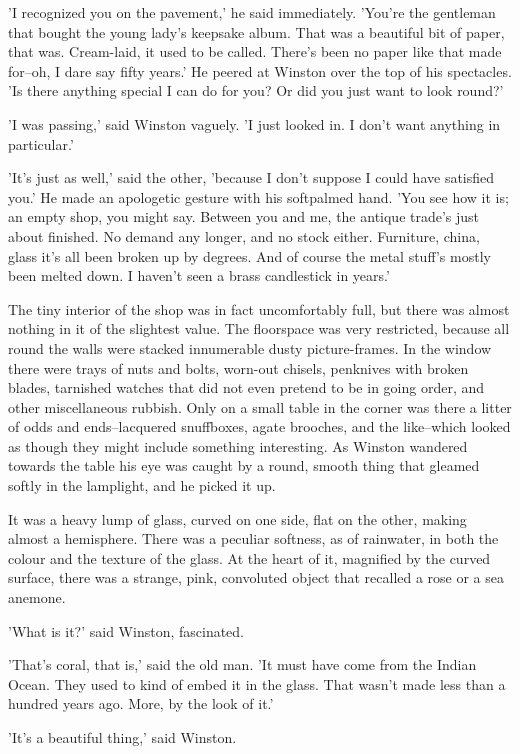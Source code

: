 \documentclass{article}
\begin{document}
'I recognized you on the pavement,' he said immediately. 'You're the
gentleman that bought the young lady's keepsake album. That was a beautiful
bit of paper, that was. Cream-laid, it used to be called. There's been no
paper like that made for--oh, I dare say fifty years.' He peered at Winston
over the top of his spectacles. 'Is there anything special I can do for
you? Or did you just want to look round?'

'I was passing,' said Winston vaguely. 'I just looked in. I don't want
anything in particular.'

'It's just as well,' said the other, 'because I don't suppose I could have
satisfied you.' He made an apologetic gesture with his softpalmed hand.
'You see how it is; an empty shop, you might say. Between you and me, the
antique trade's just about finished. No demand any longer, and no stock
either. Furniture, china, glass it's all been broken up by degrees. And
of course the metal stuff's mostly been melted down. I haven't seen a brass
candlestick in years.'

The tiny interior of the shop was in fact uncomfortably full, but there
was almost nothing in it of the slightest value. The floorspace was very
restricted, because all round the walls were stacked innumerable dusty
picture-frames. In the window there were trays of nuts and bolts, worn-out
chisels, penknives with broken blades, tarnished watches that did not even
pretend to be in going order, and other miscellaneous rubbish. Only on a
small table in the corner was there a litter of odds and ends--lacquered
snuffboxes, agate brooches, and the like--which looked as though they might
include something interesting. As Winston wandered towards the table his
eye was caught by a round, smooth thing that gleamed softly in the
lamplight, and he picked it up.

It was a heavy lump of glass, curved on one side, flat on the other, making
almost a hemisphere. There was a peculiar softness, as of rainwater, in
both the colour and the texture of the glass. At the heart of it, magnified
by the curved surface, there was a strange, pink, convoluted object that
recalled a rose or a sea anemone.

'What is it?' said Winston, fascinated.

'That's coral, that is,' said the old man. 'It must have come from the
Indian Ocean. They used to kind of embed it in the glass. That wasn't made
less than a hundred years ago. More, by the look of it.'

'It's a beautiful thing,' said Winston.
\end{document}
